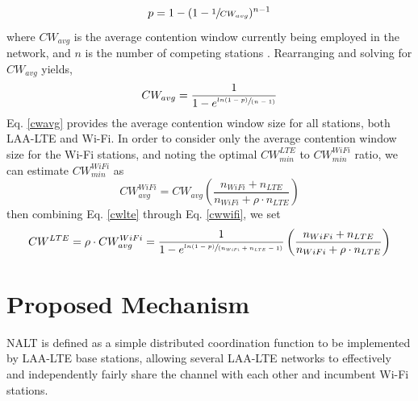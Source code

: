 \begin{equation}\label{pcollision}
p = 1-(1-\sfrac{1}{CW_{avg}})^{n-1}
\end{equation}
where $CW_{avg}$ is the average contention window currently being employed in the network, and $n$ is the number of competing stations \cite{vu}.  Rearranging and solving for $CW_{avg}$ yields,
\begin{equation}\label{cwavg}
CW_{avg} = \frac{1}{1-e^{ \sfrac{ln(1-p)}{(n-1)} }}
\end{equation}
Eq. \ref{cwavg} provides the average contention window size for all stations, both LAA-LTE and Wi-Fi.  In order to consider only the average contention window size for the \mbox{Wi-Fi} stations, and noting the optimal $CW^{LTE}_{min}$ to $CW^{WiFi}_{min}$ ratio, we can estimate $CW^{WiFi}_{min}$ as
\begin{equation}\label{cwwifi}
CW^{WiFi}_{avg} = CW_{avg}\left ( \frac{n_{WiFi} + n_{LTE}}{n_{WiFi} + \rho\cdot n_{LTE}} \right )
\end{equation}
then combining Eq. \ref{cwlte} through Eq. \ref{cwwifi},  we set 
\begin{equation}\label{cwlteopt}
CW^{LTE} = \rho \cdot{CW^{WiFi}_{avg}} = \frac{1}{1-e^{ \sfrac{ln(1-p)}{(n_{WiFi} + n_{LTE}-1)} }}\left ( \frac{n_{WiFi} + n_{LTE}}{n_{WiFi} + \rho\cdot n_{LTE}} \right )
\end{equation}


\section{Proposed Mechanism}
\label{proposed}
NALT is defined as a simple distributed coordination function to be implemented by LAA-LTE base stations, allowing several LAA-LTE networks to effectively and independently fairly share the channel with each other and incumbent Wi-Fi stations. 

